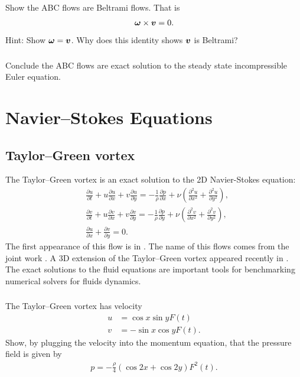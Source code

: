 \documentclass[11pt,letterpaper]{report}
\begin{document}
\subsection{}
Show the ABC flows are Beltrami flows. That is
\begin{align}
    \boldsymbol{\omega}\times\boldsymbol{v} = 0.
\end{align}
Hint: Show $\boldsymbol{\omega} = \boldsymbol{v}$. Why does this identity shows $\boldsymbol{v}$ is Beltrami?

\subsection{}
Conclude the ABC flows are exact solution to the steady state incompressible Euler equation.

\chapter{Navier–Stokes Equations}
\section{Taylor–Green vortex}
The Taylor–Green vortex is an exact solution to the 2D Navier-Stokes equation:
\begin{align}
    &\frac{\partial u}{\partial t} + u\frac{\partial u}{\partial x} + v\frac{\partial u}{\partial y} = -\frac{1}{\rho} \frac{\partial p}{\partial x} + \nu \left( \frac{\partial^2 u}{\partial x^2} + \frac{\partial^2 u}{\partial y^2} \right),\\
    &\frac{\partial v}{\partial t} + u\frac{\partial v}{\partial x} + v\frac{\partial v}{\partial y} = -\frac{1}{\rho} \frac{\partial p}{\partial y} + \nu \left( \frac{\partial^2 v}{\partial x^2} + \frac{\partial^2 v}{\partial y^2} \right),\\
    &\frac{\partial u}{\partial x}+ \frac{\partial v}{\partial y} = 0.
\end{align}
The first appearance of this flow is in \cite{Taylor_23}. The name of this flows comes from the joint work \cite{TaylorGreen_37}. A 3D extension of the Taylor–Green vortex appeared recently in \cite{Antuono_20}. The exact solutions to the fluid equations are important tools for benchmarking numerical solvers for fluids dynamics. 

\subsection{}
The Taylor–Green vortex has velocity
\begin{align}
    u &= \cos x\sin y F(t)\\
    v &= -\sin x\cos y F(t).
\end{align}
Show, by plugging the velocity into the momentum equation, that the pressure field is given by
\begin{align}
    p = -\frac{\rho}{4}(\cos 2x+\cos 2y)F^2(t).
\end{align}
\end{document}
